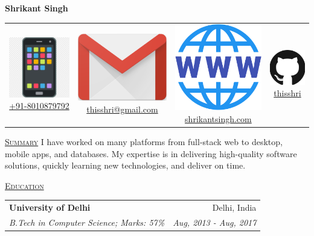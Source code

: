 \documentclass[11pt, a4paper]{article}
\begin{document}
\begin{center}
    \textbf{{\huge Shrikant Singh}}
\end{center}
\begin{center}
    \begin{tabular}{ c | c | c | c}
        \includegraphics[height=.018\textwidth]{phone} \href{tel:+918010879792}{+91-8010879792} &
        \includegraphics[height=.018\textwidth]{gmail} \href{mailto:thisshri@gmail.com} {thisshri@gmail.com} &
        \includegraphics[height=.018\textwidth]{web} \href{https://shrikantsingh.com} {shrikantsingh.com}&
        \includegraphics[height=.018\textwidth]{github} \href{https://github.com/thisshri} {thisshri} \\
    \end{tabular}
\end{center}

\begin{flushleft}
    \uline{\textsc{\large{Summary}}\hfill}
    \newline
    \newline
    I have worked on many platforms from full-stack web to desktop, mobile apps, and databases. My expertise is in delivering high-quality software solutions, quickly learning new technologies, and deliver on time.
    \newline
\end{flushleft}

\begin{flushleft}
    \uline{\textsc{\large{Education}}\hfill}
    \newline
    \newline
    \setlength\tabcolsep{0pt}
    \begin{tabularx}{\textwidth}{X r}
        \large{\textbf{University of Delhi}} & Delhi, India \\
        \textit{B.Tech in Computer Science; Marks: 57\%} & \textit{Aug, 2013 - Aug, 2017} \\
    \end{tabularx}
    \newline
\end{flushleft}
\end{document}
